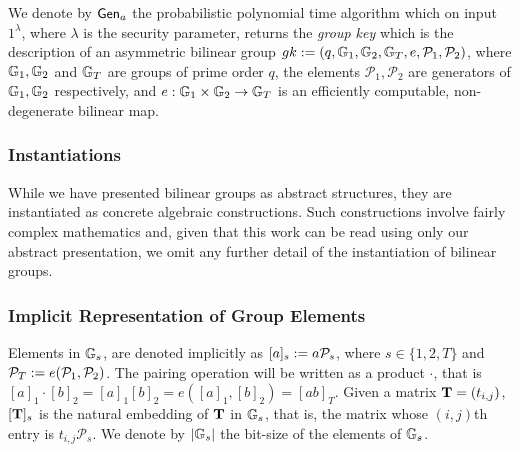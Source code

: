 We denote by $\mathsf{Gen}_a$ the probabilistic polynomial time algorithm which on input $1^{\lambda}$, where $\lambda$ is the security parameter, returns the \emph{group key} which is the description of an asymmetric bilinear group $gk:=(q,\mathbb{G}_1,\mathbb{G}_2,\mathbb{G}_T,e,\mathcal{P}_1,\mathcal{P}_2)$, where $\mathbb{G}_1,\mathbb{G}_2$
and $\mathbb{G}_T$ are groups of prime order $q$, the elements $\mathcal{P}_1, \mathcal{P}_2$ are generators of 
$\mathbb{G}_1,\mathbb{G}_2$ respectively, and $e:\mathbb{G}_1\times\mathbb{G}_2\to\mathbb{G}_T$ is an efficiently
computable, non-degenerate bilinear map. 

\subsubsection{Instantiations}
While we have presented bilinear groups as abstract structures, they are instantiated as concrete algebraic constructions. Such constructions involve fairly complex mathematics and, given that this work can be read using only our abstract presentation, we omit any further detail of the instantiation of bilinear groups.


\subsubsection{Implicit Representation of Group Elements}

Elements in $\mathbb{G}_s$, are denoted implicitly as $[a]_s:=a \mathcal{P}_s$, where $s \in \{1,2,T\}$ and $\mathcal{P}_T:=e(\mathcal{P}_1,\mathcal{P}_2)$. 
The pairing operation will be written as a product $\cdot$, that is $[a]_1 \cdot [b]_2=[a]_1 [b]_2=e([a]_1,[b]_2)=[ab]_T$. Given a matrix $\mathbf{{T}}=(t_{i,j})$, $[\mathbf{{T}}]_s$ is
the natural embedding of $\mathbf{{T}}$ in $\mathbb{G}_s$, that is, the matrix whose $(i,j)$th entry
is $t_{i,j}\mathcal{P}_s$. We denote by $|\mathbb{G}_s|$ the bit-size of the elements of $\mathbb{G}_s$.

